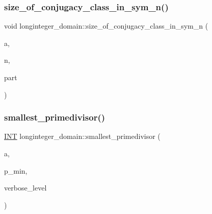 \mbox{\label{classlonginteger__domain_aa82a43461e68d34733b1d58cce5a5505}} 
\subsubsection{\texorpdfstring{size\+\_\+of\+\_\+conjugacy\+\_\+class\+\_\+in\+\_\+sym\+\_\+n()}{size\_of\_conjugacy\_class\_in\_sym\_n()}}
{\footnotesize\ttfamily void longinteger\+\_\+domain\+::size\+\_\+of\+\_\+conjugacy\+\_\+class\+\_\+in\+\_\+sym\+\_\+n (\begin{DoxyParamCaption}\item[{\mbox{\hyperlink{classlonginteger__object}{longinteger\+\_\+object}} \&}]{a,  }\item[{\mbox{\hyperlink{galois_8h_a09fddde158a3a20bd2dcadb609de11dc}{I\+NT}}}]{n,  }\item[{\mbox{\hyperlink{galois_8h_a09fddde158a3a20bd2dcadb609de11dc}{I\+NT}} $\ast$}]{part }\end{DoxyParamCaption})}

\mbox{\label{classlonginteger__domain_a70d8dddc346b041c751a135e793a2689}} 
\subsubsection{\texorpdfstring{smallest\+\_\+primedivisor()}{smallest\_primedivisor()}}
{\footnotesize\ttfamily \mbox{\hyperlink{galois_8h_a09fddde158a3a20bd2dcadb609de11dc}{I\+NT}} longinteger\+\_\+domain\+::smallest\+\_\+primedivisor (\begin{DoxyParamCaption}\item[{\mbox{\hyperlink{classlonginteger__object}{longinteger\+\_\+object}} \&}]{a,  }\item[{\mbox{\hyperlink{galois_8h_a09fddde158a3a20bd2dcadb609de11dc}{I\+NT}}}]{p\+\_\+min,  }\item[{\mbox{\hyperlink{galois_8h_a09fddde158a3a20bd2dcadb609de11dc}{I\+NT}}}]{verbose\+\_\+level }\end{DoxyParamCaption})}

